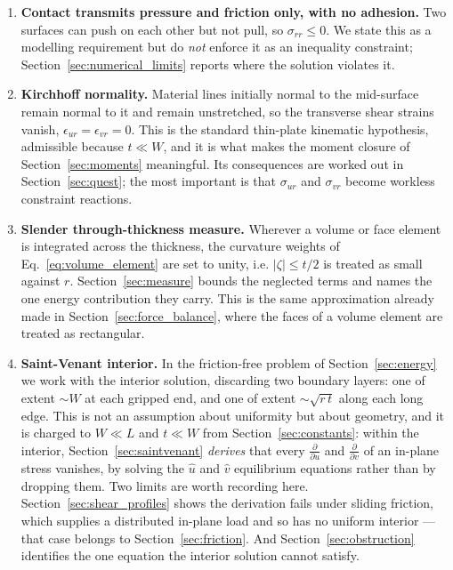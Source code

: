 \documentclass[11pt]{article}
\begin{document}
\begin{enumerate}
\item \textbf{Contact transmits pressure and friction only, with no adhesion.}
  Two surfaces can push on each other but not pull, so $\sigma_{rr} \le 0$. We
  state this as a modelling requirement but do \emph{not} enforce it as an
  inequality constraint; Section~\ref{sec:numerical_limits} reports where the
  solution violates it.

\item \textbf{Kirchhoff normality.} Material lines initially normal to the
  mid-surface remain normal to it and remain unstretched, so the transverse shear
  strains vanish, $\epsilon_{ur} = \epsilon_{vr} = 0$. This is the standard
  thin-plate kinematic hypothesis, admissible because $t \ll W$, and it is what
  makes the moment closure of Section~\ref{sec:moments} meaningful. Its
  consequences are worked out in Section~\ref{sec:quest}; the most important
  is that $\sigma_{ur}$ and $\sigma_{vr}$ become workless constraint reactions.

\item \textbf{Slender through-thickness measure.} Wherever a volume or face
  element is integrated across the thickness, the curvature weights of
  Eq.~\eqref{eq:volume_element} are set to unity, i.e. $|\zeta| \le t/2$ is
  treated as small against $r$. Section~\ref{sec:measure} bounds the neglected
  terms and names the one energy contribution they carry. This is the same
  approximation already made in Section~\ref{sec:force_balance}, where the faces
  of a volume element are treated as rectangular.

\item \textbf{Saint-Venant interior.} In the friction-free problem of
  Section~\ref{sec:energy} we work with the interior solution, discarding two
  boundary layers: one of extent $\sim W$ at each gripped end, and one of extent
  $\sim\sqrt{r\,t}$ along each long edge. This is not an assumption about
  uniformity but about geometry, and it is charged to $W \ll L$ and
  $t \ll W$ from Section~\ref{sec:constants}: within the interior,
  Section~\ref{sec:saintvenant} \emph{derives} that every
  $\frac{\partial}{\partial u}$ and $\frac{\partial}{\partial v}$ of an in-plane
  stress vanishes, by solving the $\hat u$ and $\hat v$ equilibrium equations
  rather than by dropping them. Two limits are worth recording here.
  Section~\ref{sec:shear_profiles} shows the derivation fails under sliding
  friction, which supplies a distributed in-plane load and so has no uniform
  interior --- that case belongs to Section~\ref{sec:friction}. And
  Section~\ref{sec:obstruction} identifies the one equation the interior
  solution cannot satisfy.
\end{enumerate}
\end{document}
